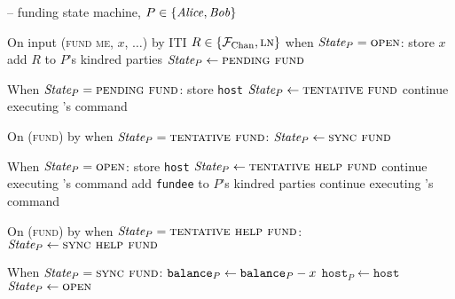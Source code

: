 \begin{center}
  \begin{systembox}{\fchan{} -- funding state machine, $P \in \{\mathit{Alice}, \mathit{Bob}\}$}
    \begin{algorithmic}[1]
      \State On input (\textsc{fund me}, $x$, $\dots$) by ITI $R \in \{\mathcal{F}_{\mathrm{Chan}},
      \textsc{ln}\}$ when $\itistate_P = \textsc{open}$:
      \label{code:functionality:fund:when-fund}
      \Indent
        \State store $x$
        \State add $R$ to $P$'s kindred parties
        \State $\itistate_P \gets \textsc{pending fund}$
      \EndIndent
      \Statex

      \State When $\itistate_P = \textsc{pending fund}$:
      \Indent
          \State store \texttt{host}
          \State $\itistate_P \gets \textsc{tentative fund}$
          \State continue executing \adversary's command
        \EndIf
      \EndIndent
      \Statex

      \State On (\textsc{fund}) by \adversary when $\itistate_P =
      \textsc{tentative fund}$:
      \Indent
        \State $\itistate_P \gets \textsc{sync fund}$
      \EndIndent
      \Statex

      \State When $\itistate_P = \textsc{open}$:
      \Indent
          \State store \texttt{host}
          \State $\itistate_P \gets \textsc{tentative help fund}$
          \State continue executing \adversary's command
        \EndIf
          \State add \texttt{fundee} to $P$'s kindred parties
          \State continue executing \adversary's command
        \EndIf
      \EndIndent
      \Statex

      \State On (\textsc{fund}) by \adversary when $\itistate_P =
      \textsc{tentative help fund}$:
      \Indent
        \State $\itistate_P \gets \textsc{sync help fund}$
      \EndIndent
      \Statex

      \State When $\itistate_P = \textsc{sync fund}$:
      \Indent
          \State $\texttt{balance}_{P} \gets \texttt{balance}_{P} - x$
          \label{code:functionality:fund:complete-fund}
          \State $\texttt{host}_P \gets \texttt{host}$
          \State {}
          \State $\itistate_P \gets \textsc{open}$
          \label{code:functionality:fund:fund-end}
        \EndIf
      \EndIndent
      \Statex


\end{algorithmic}
\end{systembox}
\end{center}
